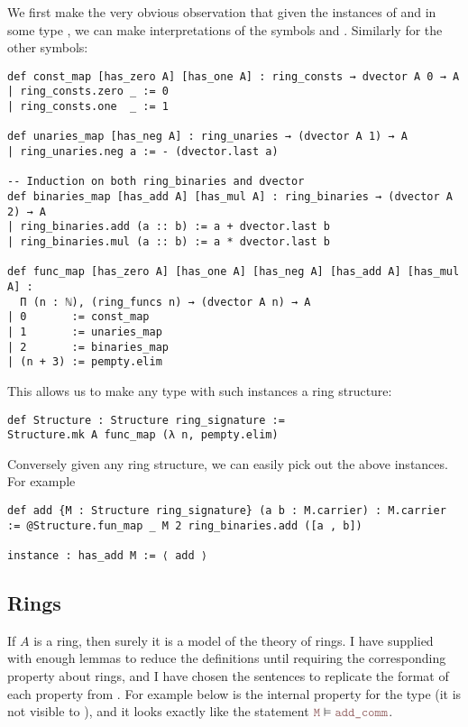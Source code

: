 We first make the very obvious observation that given
the  instances of  and 
in some type ,
we can make interpretations of the symbols 
and .
Similarly for the other symbols:

\begin{lstlisting}
def const_map [has_zero A] [has_one A] : ring_consts → dvector A 0 → A
| ring_consts.zero _ := 0
| ring_consts.one  _ := 1

def unaries_map [has_neg A] : ring_unaries → (dvector A 1) → A
| ring_unaries.neg a := - (dvector.last a)

-- Induction on both ring_binaries and dvector
def binaries_map [has_add A] [has_mul A] : ring_binaries → (dvector A 2) → A
| ring_binaries.add (a :: b) := a + dvector.last b
| ring_binaries.mul (a :: b) := a * dvector.last b

def func_map [has_zero A] [has_one A] [has_neg A] [has_add A] [has_mul A] :
  Π (n : ℕ), (ring_funcs n) → (dvector A n) → A
| 0       := const_map
| 1       := unaries_map
| 2       := binaries_map
| (n + 3) := pempty.elim\end{lstlisting}

This allows us to make any type with such instances a ring structure:

\begin{lstlisting}
def Structure : Structure ring_signature :=
Structure.mk A func_map (λ n, pempty.elim)\end{lstlisting}

Conversely given any ring structure,
we can easily pick out the above instances.
For example
\begin{lstlisting}
def add {M : Structure ring_signature} (a b : M.carrier) : M.carrier := @Structure.fun_map _ M 2 ring_binaries.add ([a , b])

instance : has_add M := ⟨ add ⟩\end{lstlisting}

\subsection{Rings}
If $A$ is a ring, then surely it is a model of the theory of rings.
I have supplied  with enough lemmas to reduce the definitions
until requiring the corresponding property about rings,
and I have chosen the sentences to replicate the format of
each property from .
For example  below
is the internal property for the type 
(it is not visible to ),
and it looks exactly like the statement $\code{M} \vDash \code{add\_comm}$.

